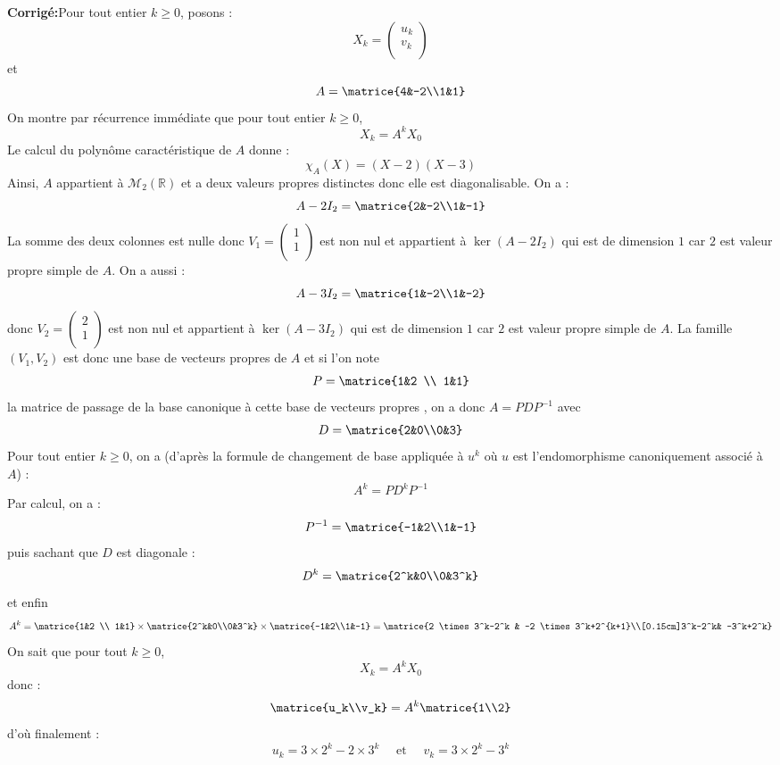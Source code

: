 \documentclass[a4paper,twoside,french,10pt]{VcCours}
\newcommand{\corr}{\textbf{Corrigé:}}
\begin{document}
\corr Pour tout entier $k \geq 0$, posons :
$$ X_k = \begin{pmatrix}
u_k \\
v_k \\
\end{pmatrix}$$
et
$$ A=\matrice{4&-2\\1&1} $$
On montre par récurrence immédiate que pour tout entier $k \geq 0$,
$$ X_k=A^k X_0$$
Le calcul du polynôme caractéristique de $A$ donne :
$$ \chi_A(X) = (X-2)(X-3)$$
Ainsi, $A$ appartient à $\mathcal{M}_2(\mathbb{R})$ et a deux valeurs propres distinctes donc elle est diagonalisable. On a :
$$ A - 2I_2 = \matrice{2&-2\\1&-1}$$
La somme des deux colonnes est nulle donc $V_1=\begin{pmatrix}
1 \\
1 \\
\end{pmatrix}$
est non nul et appartient à $\ker(A-2I_2)$ qui est de dimension $1$ car $2$ est valeur propre simple de $A$. On a aussi :
$$A-3I_2=\matrice{1&-2\\1&-2}$$ 
donc $V_2=\begin{pmatrix}
2 \\
1 \\
\end{pmatrix}$ est non nul et appartient à $\ker(A-3I_2)$ qui est de dimension $1$ car $2$ est valeur propre simple de $A$. La famille $(V_1,V_2)$ est donc une base de vecteurs propres de $A$ et si l'on note 
$$P=\matrice{1&2 \\ 1&1}$$
la matrice de passage de la base canonique \`a cette base de vecteurs propres , on a donc $A=PDP^{-1}$ avec 
$$D=\matrice{2&0\\0&3}$$
Pour tout entier $k \geq 0$, on a (d'après la formule de changement de base appliquée à $u^k$ où $u$ est l'endomorphisme canoniquement associé à $A$) :
$$A^k=PD^kP^{-1}$$
Par calcul, on a : 
$$P^{-1}=\matrice{-1&2\\1&-1}$$
puis sachant que $D$ est diagonale : 
$$D^k=\matrice{2^k&0\\0&3^k}$$ 
et enfin 
$$A^k=\matrice{1&2 \\ 1&1}\times\matrice{2^k&0\\0&3^k}\times \matrice{-1&2\\1&-1} = \matrice{2 \times 3^k-2^k & -2 \times 3^k+2^{k+1}\\[0.15cm]3^k-2^k& -3^k+2^k}$$
On sait que pour tout $k \geq 0$,
$$X_k=A^kX_0$$
donc :
$$\matrice{u_k\\v_k}=A^k\matrice{1\\2}$$
d'o\`u finalement :
\[
u_k=3 \times 2^k-2 \times 3^k \quad \textrm{ et } \quad v_k=3 \times 2^k-3^k 
\]
\end{document}
